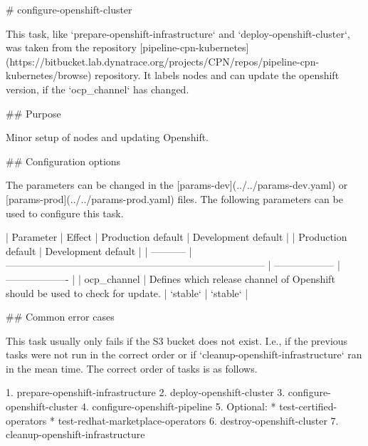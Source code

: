 # configure-openshift-cluster

This task, like `prepare-openshift-infrastructure` and `deploy-openshift-cluster`, was taken from the repository [pipeline-cpn-kubernetes](https://bitbucket.lab.dynatrace.org/projects/CPN/repos/pipeline-cpn-kubernetes/browse) repository.
It labels nodes and can update the openshift version, if the `{ocp_channel}` has changed.

## Purpose

Minor setup of nodes and updating Openshift.

## Configuration options

The parameters can be changed in the [params-dev](../../params-dev.yaml) or [params-prod](../../params-prod.yaml) files.
The following parameters can be used to configure this task.

| Parameter   | Effect                                                                         | Production default | Development default |  | Production default | Development default |
| ----------- | ------------------------------------------------------------------------------ | ------------------ | ------------------- |
| ocp_channel | Defines which release channel of Openshift should be used to check for update. | `stable`           | `stable`            |

## Common error cases

This task usually only fails if the S3 bucket does not exist. 
I.e., if the previous tasks were not run in the correct order or if `cleanup-openshift-infrastructure` ran in the mean time.
The correct order of tasks is as follows.

1. prepare-openshift-infrastructure
2. deploy-openshift-cluster
3. configure-openshift-cluster
4. configure-openshift-pipeline
5. Optional:
   * test-certified-operators
   * test-redhat-marketplace-operators
6. destroy-openshift-cluster
7. cleanup-openshift-infrastructure
